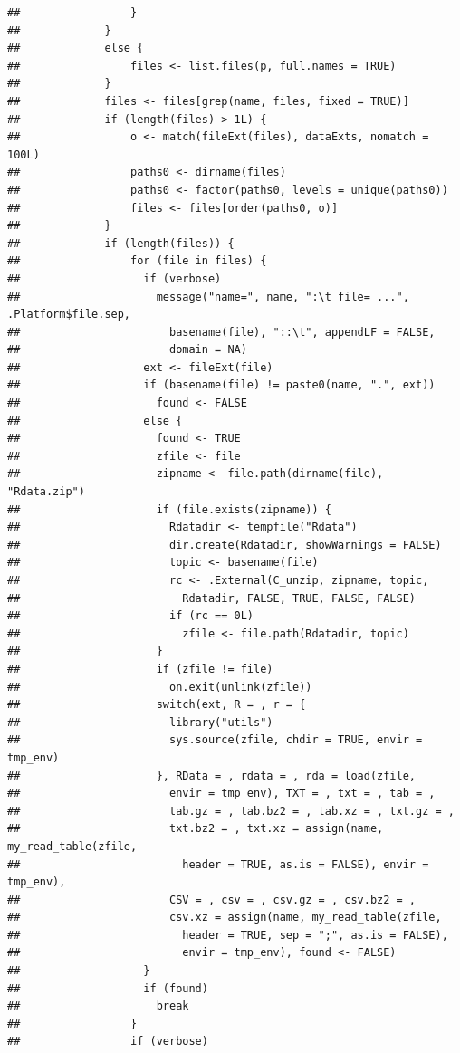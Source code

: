 \documentclass[
]{article}
\begin{document}
\begin{verbatim}
##                 }
##             }
##             else {
##                 files <- list.files(p, full.names = TRUE)
##             }
##             files <- files[grep(name, files, fixed = TRUE)]
##             if (length(files) > 1L) {
##                 o <- match(fileExt(files), dataExts, nomatch = 100L)
##                 paths0 <- dirname(files)
##                 paths0 <- factor(paths0, levels = unique(paths0))
##                 files <- files[order(paths0, o)]
##             }
##             if (length(files)) {
##                 for (file in files) {
##                   if (verbose) 
##                     message("name=", name, ":\t file= ...", .Platform$file.sep, 
##                       basename(file), "::\t", appendLF = FALSE, 
##                       domain = NA)
##                   ext <- fileExt(file)
##                   if (basename(file) != paste0(name, ".", ext)) 
##                     found <- FALSE
##                   else {
##                     found <- TRUE
##                     zfile <- file
##                     zipname <- file.path(dirname(file), "Rdata.zip")
##                     if (file.exists(zipname)) {
##                       Rdatadir <- tempfile("Rdata")
##                       dir.create(Rdatadir, showWarnings = FALSE)
##                       topic <- basename(file)
##                       rc <- .External(C_unzip, zipname, topic, 
##                         Rdatadir, FALSE, TRUE, FALSE, FALSE)
##                       if (rc == 0L) 
##                         zfile <- file.path(Rdatadir, topic)
##                     }
##                     if (zfile != file) 
##                       on.exit(unlink(zfile))
##                     switch(ext, R = , r = {
##                       library("utils")
##                       sys.source(zfile, chdir = TRUE, envir = tmp_env)
##                     }, RData = , rdata = , rda = load(zfile, 
##                       envir = tmp_env), TXT = , txt = , tab = , 
##                       tab.gz = , tab.bz2 = , tab.xz = , txt.gz = , 
##                       txt.bz2 = , txt.xz = assign(name, my_read_table(zfile, 
##                         header = TRUE, as.is = FALSE), envir = tmp_env), 
##                       CSV = , csv = , csv.gz = , csv.bz2 = , 
##                       csv.xz = assign(name, my_read_table(zfile, 
##                         header = TRUE, sep = ";", as.is = FALSE), 
##                         envir = tmp_env), found <- FALSE)
##                   }
##                   if (found) 
##                     break
##                 }
##                 if (verbose) 

\end{verbatim}
\end{document}
